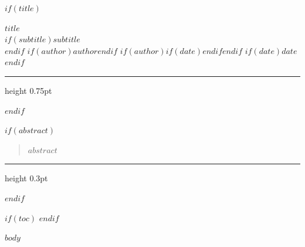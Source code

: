 \documentclass[$if(fontsize)$$fontsize$$else$12pt$endif$,$if(papersize)$$papersize$paper$else$letterpaper$endif$]{article}
\newcommand{\sep}{\enspace{\color{rulecolor}\textbullet}\enspace}
\begin{document}
\thispagestyle{plain}

$if(title)$
\begin{center}
  {\LARGE\bfseries\color{headingcolor} $title$}\\[0.5em]
  $if(subtitle)${\large\itshape $subtitle$}\\[0.5em]$endif$
  {\normalsize\color{mutedcolor}
    $if(author)$$author$$endif$%
    $if(author)$$if(date)$\sep$endif$$endif$%
    $if(date)$$date$$endif$%
  }
\end{center}

\vspace{0.3em}
{\color{rulecolor}\hrule height 0.75pt}
\vspace{1em}
$endif$

$if(abstract)$
\begin{quote}
  \small\itshape\color{mutedcolor} $abstract$
\end{quote}
\vspace{0.7em}
{\color{rulecolor}\hrule height 0.3pt}
\vspace{1em}
$endif$

$if(toc)$
\tableofcontents
\vspace{1em}
\vspace{1em}
$endif$

$body$
\end{document}
